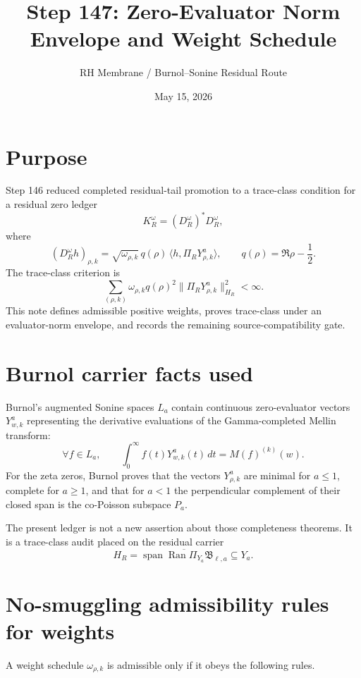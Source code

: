 \documentclass[11pt]{article}
\title{Step 147: Zero-Evaluator Norm Envelope and Weight Schedule}
\author{RH Membrane / Burnol--Sonine Residual Route}
\date{May 15, 2026}
\begin{document}
\maketitle

\section{Purpose}
Step 146 reduced completed residual-tail promotion to a trace-class condition for a residual zero ledger
\[
  K_R^\omega=(D_R^\omega)^*D_R^\omega,
\]
where
\[
  (D_R^\omega h)_{\rho,k}
  =\sqrt{\omega_{\rho,k}}\,q(\rho)\,\langle h,\Pi_RY^a_{\rho,k}\rangle,
  \qquad q(\rho)=\Re\rho-\frac12.
\]
The trace-class criterion is
\[
  \sum_{(\rho,k)}\omega_{\rho,k}q(\rho)^2
  \|\Pi_RY^a_{\rho,k}\|_{H_R}^2 <\infty.
\]
This note defines admissible positive weights, proves trace-class under an evaluator-norm envelope, and records the remaining source-compatibility gate.

\section{Burnol carrier facts used}
Burnol's augmented Sonine spaces $L_a$ contain continuous zero-evaluator vectors $Y^a_{w,k}$ representing the derivative evaluations of the Gamma-completed Mellin transform:
\[
  \forall f\in L_a,
  \qquad
  \int_0^\infty f(t)Y^a_{w,k}(t)\,dt=M(f)^{(k)}(w).
\]
For the zeta zeros, Burnol proves that the vectors $Y^a_{\rho,k}$ are minimal for $a\le 1$, complete for $a\ge 1$, and that for $a<1$ the perpendicular complement of their closed span is the co-Poisson subspace $P_a$.

The present ledger is not a new assertion about those completeness theorems. It is a trace-class audit placed on the residual carrier
\[
  H_R=\overline{\operatorname{span}\operatorname{Ran}\Pi_{Y_a}\mathfrak B_{\ell,a}}\subseteq Y_a.
\]

\section{No-smuggling admissibility rules for weights}
A weight schedule $\omega_{\rho,k}$ is admissible only if it obeys the following rules.
\end{document}
